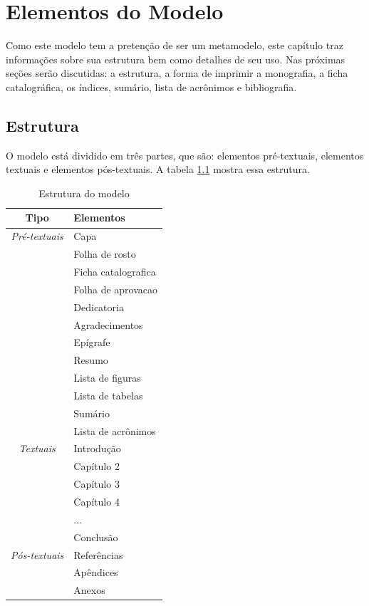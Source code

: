 \chapter{Elementos do Modelo}
Como este modelo tem a pretenção de ser um metamodelo, este capítulo traz informações sobre sua estrutura bem como detalhes de seu uso. Nas próximas seções serão discutidas: a estrutura, a forma de imprimir a monografia, a ficha catalográfica, os índices, sumário, lista de acrônimos e bibliografia.

\section{Estrutura}
O modelo está dividido em três partes, que são: elementos pré-textuais, elementos textuais e 
elementos pós-textuais. A tabela \ref{estrutura} mostra essa estrutura.


\begin{table}  %
\setlength{\baselineskip}{0.8\baselineskip} 
\centering
\caption{Estrutura do modelo}
\begin{tabular}{|c|l|}
\hline 
\hline
\textbf{Tipo }& \textbf{Elementos} \\ 
\hline 
\hline
\emph{Pré-textuais} & Capa\\ 
& Folha de rosto\\
& Ficha catalografica\\
& Folha de aprovacao\\
& Dedicatoria\\
& Agradecimentos\\
& Epígrafe\\
& Resumo\\
& Lista de figuras\\
& Lista de tabelas\\
& Sumário\\
& Lista de acrônimos 		\\
\hline 
\emph{Textuais} & Introdução \\ 
& Capítulo 2\\
& Capítulo 3\\
& Capítulo 4\\
& ...\\
& Conclusão \\
\hline 
\emph{Pós-textuais} & Referências\\
& Apêndices\\
& Anexos\\
\hline 

\end{tabular} \label{estrutura}

\end{table}

